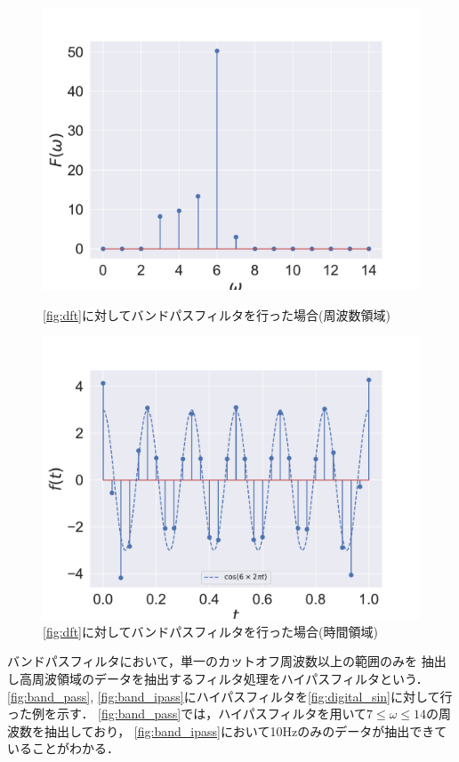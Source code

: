 \iffigure
\begin{figure}[h]
  \begin{minipage}{.45\hsize}
    \centering
    \includegraphics[clip, width=\textwidth]{figure/band_pass_dft.pdf}
    \caption{\autoref{fig:dft}に対してバンドパスフィルタを行った場合(周波数領域)}
    \label{fig:band_pass}
  \end{minipage}
  \begin{minipage}{.45\hsize}
    \centering
    \includegraphics[clip, width=\textwidth]{figure/band_pass_idft.pdf}
    \caption{\autoref{fig:dft}に対してバンドパスフィルタを行った場合(時間領域)}
    \label{fig:band_ipass}
  \end{minipage}
\end{figure}
\fi
バンドパスフィルタにおいて，単一のカットオフ周波数以上の範囲のみを
抽出し高周波領域のデータを抽出するフィルタ処理をハイパスフィルタという．
\autoref{fig:band_pass}, \autoref{fig:band_ipass}にハイパスフィルタを\autoref{fig:digital_sin}に対して行った例を示す．
\autoref{fig:band_pass}では，ハイパスフィルタを用いて$7 \le \omega \le 14$の周波数を抽出しており，
\autoref{fig:band_ipass}において10Hzのみのデータが抽出できていることがわかる．

